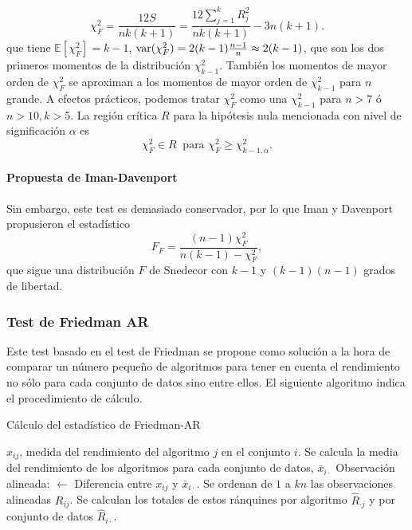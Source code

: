 	\[ \chi^2_F = \frac{12S}{nk(k+1)} = 
	\frac{12 \sum\limits_{j=1}^k R_j^2}{nk(k+1)} -3n(k+1) .
	\]
	que tiene $\mathbb{E}[\chi^2_F] = k-1$, $\text{var}(\chi^2_F)= 2(k-1)
\frac{n-1}{n} \approx 2(k-1)$, que son los dos primeros 
momentos de la distribución $\chi^2_{k-1}$. También los 
momentos de mayor orden de $\chi^2_F$ se aproximan a los 
momentos de mayor orden de $\chi^2_{k-1}$ para $n$ grande. A 
efectos prácticos, podemos tratar $\chi^2_F$ como una $
\chi^2_{k-1}$ para $n>7$ ó $n>10, k>5$. La región crítica $R$
para la hipótesis nula mencionada con nivel de significación 
$\alpha$ es
	\[ 
		\chi^2_F \in R \ \text{ para } 
			\chi^2_F \geq \chi_{k-1,\alpha}^2 .
	\]
	
\paragraph{Propuesta de Iman-Davenport} Sin embargo, este
test es demasiado conservador, por lo que Iman y Davenport
propusieron el estadístico
	\[
		F_F = \frac{(n-1)\chi^2_F}{n(k-1) - \chi^2_F},
	\]
	que sigue una distribución $F$ de Snedecor con $k-1$ y
$(k-1)(n-1)$ grados de libertad.
	
	
\subsubsection{Test de Friedman AR}
	Este test basado en el test de Friedman se propone como
solución a la hora de comparar un número pequeño de 
algoritmos para tener en cuenta el rendimiento no sólo 
para cada conjunto de datos sino entre ellos. El
siguiente algoritmo indica el procedimiento de cálculo.\\
	
\begin{algorithm}
	\caption{Cálculo del estadístico de Friedman-AR}
	\label{alg:Friedman-AR}
	\begin{algorithmic}[1]
	\REQUIRE $x_{ij}$, medida del rendimiento del
			algoritmo $j$ en el conjunto $i$.
	\STATE Se calcula la media del rendimiento de los 
		algoritmos para cada conjunto de datos, 
		$\bar{x}_{i \cdot}$
		\STATE Observación alineada: $\leftarrow$
			Diferencia entre $x_{ij}$ y $\bar{x}_{i \cdot}$.	
	\ENDFOR
	\STATE Se ordenan de $1$ a $kn$ las observaciones 
		alineadas $R_{ij}$.
	\STATE Se calculan los totales de estos ránquines
		por algoritmo $\hat{R}_{\cdot j}$ y por
		conjunto de datos $\hat{R}_{i \cdot}$.
	\end{algorithmic}
\end{algorithm} 

